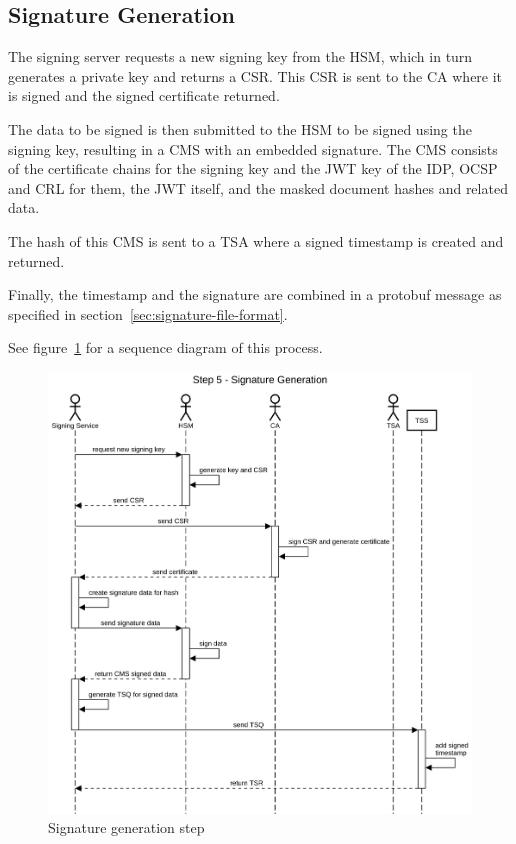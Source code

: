 \subsection{Signature Generation}\label{subsec:signature-generation}
The signing server requests a new signing key from the \gls{HSM}, which in turn generates a private key and returns a \gls{CSR}.
This \gls{CSR} is sent to the \gls{CA} where it is signed and the signed certificate returned.

The data to be signed is then submitted to the \gls{HSM} to be signed using the signing key,
resulting in a \gls{CMS} with an embedded signature.
The \gls{CMS} consists of the certificate chains for the signing key and the \gls{JWT} key  of the \gls{IDP},
\gls{OCSP} and \gls{CRL} for them,
the \gls{JWT} itself,
and the masked document hashes and related data.

The hash of this \gls{CMS} is sent to a \gls{TSA} where a signed timestamp is created and returned.

Finally, the timestamp and the signature are combined in a protobuf message as specified in section~\ref{sec:signature-file-format}.

See figure~\ref{fig:signaturegenerationstep} for a sequence diagram of this process.

\begin{figure}[H]
    \begin{center}
        \includegraphics[width=\linewidth]{images/protocol_step5_signature_generation.png}
        \caption{Signature generation step}
        \label{fig:signaturegenerationstep}
    \end{center}
\end{figure}

